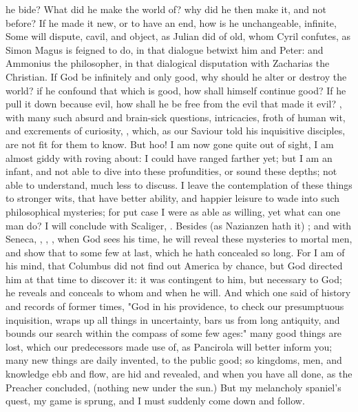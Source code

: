 {he bide? What did he make the world of? why did he then make it, and not before? If he made it new, or to have an end, how is he unchangeable, infinite, \etc{} Some will dispute, cavil, and object, as Julian did of old, whom Cyril confutes, as Simon Magus is feigned to do, in that dialogue betwixt him and Peter: and Ammonius the philosopher, in that dialogical disputation with Zacharias the Christian. If God be infinitely and only good, why should he alter or destroy the world? if he confound that which is good, how shall himself continue good? If he pull it down because evil, how shall he be free from the evil that made it evil? \etc{}, with many such absurd and brain-sick questions, intricacies, froth of human wit, and excrements of curiosity, \etc{}, which, as our Saviour told his inquisitive disciples, are not fit for them to know. But hoo! I am now gone quite out of sight, I am almost giddy with roving about: I could have ranged farther yet; but I am an infant, and not able to dive into these profundities, or sound these depths; not able to understand, much less to discuss. I leave the contemplation of these things to stronger wits, that have better ability, and happier leisure to wade into such philosophical mysteries; for put case I were as able as willing, yet what can one man do? I will conclude with Scaliger, . Besides (as Nazianzen hath it) ; and with Seneca, , , \etc{}, when God sees his time, he will reveal these mysteries to mortal men, and show that to some few at last, which he hath concealed so long. For I am of his mind, that Columbus did not find out America by chance, but God directed him at that time to discover it: it was contingent to him, but necessary to God; he reveals and conceals to whom and when he will. And which one said of history and records of former times, "God in his providence, to check our presumptuous inquisition, wraps up all things in uncertainty, bars us from long antiquity, and bounds our search within the compass of some few ages:" many good things are lost, which our predecessors made use of, as Pancirola will better inform you; many new things are daily invented, to the public good; so kingdoms, men, and knowledge ebb and flow, are hid and revealed, and when you have all done, as the Preacher concluded,  (nothing new under the sun.) But my melancholy spaniel's quest, my game is sprung, and I must suddenly come down and follow.


}
